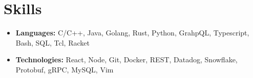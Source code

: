\documentclass[letterpaper,11pt]{article}
\newcommand{\resumeItem}[2]{
  \item{
    \textbf{#1}{: #2 \vspace{-2pt}}
  }
}
\newcommand{\resumeSubItem}[2]{\resumeItem{#1}{#2}\vspace{-4pt}}
\newcommand{\resumeSubHeadingListStart}{\begin{itemize}[leftmargin=*]}
\newcommand{\resumeSubHeadingListEnd}{\end{itemize}}
\begin{document}
%


\section{Skills}
  \begin{itemize}
    \item \textbf{Languages:} C/C++, Java, Golang, Rust, Python, GrahpQL, Typescript, Bash, SQL, Tcl, Racket \\
    \item \textbf{Technologies:} React, Node, Git, Docker, REST, Datadog, Snowflake, Protobuf, gRPC, MySQL, Vim
  \end{itemize}


\end{document}
